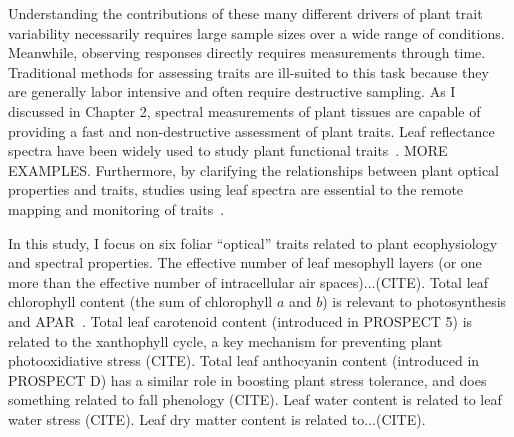 Understanding the contributions of these many different drivers of plant trait variability necessarily requires large sample sizes over a wide range of conditions.
Meanwhile, observing responses directly requires measurements through time.
Traditional methods for assessing traits are ill-suited to this task because they are generally labor intensive and often require destructive sampling.
% 
% 
As I discussed in Chapter 2, spectral measurements of plant tissues are capable of providing a fast and non-destructive assessment of plant traits.
Leaf reflectance spectra have been widely used to study plant functional traits~\cite{cavenderbares_2017_harnessing}.
MORE EXAMPLES.
Furthermore, by clarifying the relationships between plant optical properties and traits, studies using leaf spectra are essential to the remote mapping and monitoring of traits~\cite{schneider2017_mapping,schimel2013_observing,schimel2015_observing,jetz2016_diversity}.

In this study, I focus on six foliar ``optical'' traits related to plant ecophysiology and spectral properties.
The effective number of leaf mesophyll layers (or one more than the effective number of intracellular air spaces)...(CITE).
% 
% 
Total leaf chlorophyll content (the sum of chlorophyll $a$ and $b$) is relevant to photosynthesis and APAR~\cite{croft_2017_chlorophyll}.
Total leaf carotenoid content (introduced in PROSPECT 5) is related to the xanthophyll cycle, a key mechanism for preventing plant photooxidiative stress (CITE).
% 
% 
% 
%
Total leaf anthocyanin content (introduced in PROSPECT D) has a similar role in boosting plant stress tolerance, and does something related to fall phenology (CITE).
% 
% 
Leaf water content is related to leaf water stress (CITE).
Leaf dry matter content is related to...(CITE).
% 
% 

